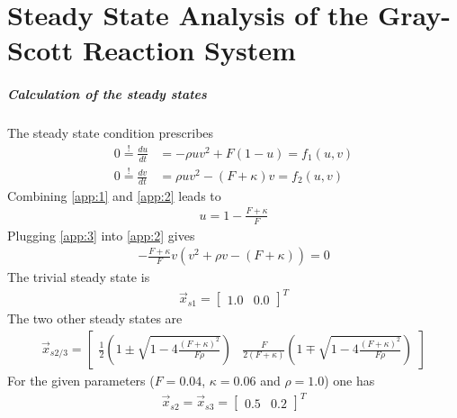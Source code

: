 \chapter{Steady State Analysis of the Gray-Scott Reaction System}
\label{ch:app1}
\paragraph{Calculation of the steady states}
The steady state condition prescribes 
\begin{align}
\label{app:1}
0 \overset{!}{=} \frac{du}{dt} &= -\rho u v^2 + F(1-u) = f_1(u,v)\\
\label{app:2}
0 \overset{!}{=} \frac{dv}{dt} &= \rho u v^2 - (F + \kappa) v = f_2(u,v)
\end{align}
Combining \eqref{app:1} and \eqref{app:2} leads to
\begin{align}
\label{app:3}
u = 1 - \frac{F + \kappa}{F}
\end{align}
Plugging \eqref{app:3} into \eqref{app:2} gives
\begin{align}
- \frac{F + \kappa}{F} v(v^2 + \rho v - (F + \kappa)) = 0
\end{align}
The trivial steady state is
\begin{align}
\vec{x}_{s1} = 
\begin{bmatrix}
1.0 & 0.0
\end{bmatrix}^T
\end{align}
The two other steady states are
\begin{align}
\vec{x}_{s2/3} = 
\begin{bmatrix}
\frac{1}{2} (1 \pm \sqrt{1 - 4 \frac{(F+\kappa)^2}{F \rho}}) &
\frac{F}{2 (F + \kappa)} (1 \mp \sqrt{1 - 4 \frac{(F + \kappa)^2}{F \rho}})
\end{bmatrix}
\end{align}
For the given parameters ($F = 0.04$, $\kappa = 0.06$ and $\rho = 1.0$) one has
\begin{align}
\vec{x}_{s2} = \vec{x}_{s3} = 
\begin{bmatrix}
0.5 & 0.2
\end{bmatrix}^T
\end{align}

